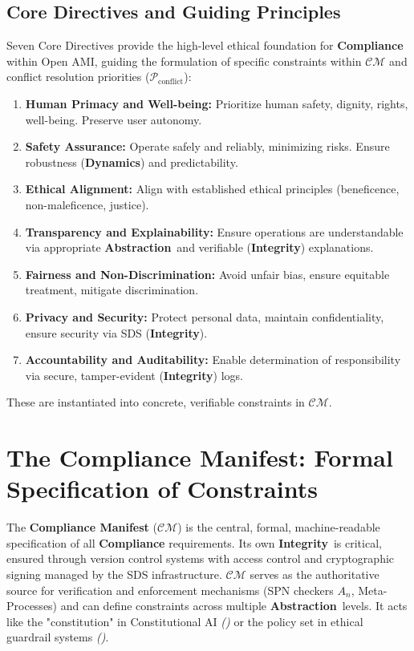 \documentclass[12pt,a4paper]{report}
\renewcommand{\citep}[1]{\textit{\scriptsize{(\cite{#1})}}}
\newcommand{\Integrity}{\textbf{Integrity}}
\newcommand{\Abstraction}{\textbf{Abstraction}}
\newcommand{\Dynamics}{\textbf{Dynamics}}
\begin{document}
	\subsection{Core Directives and Guiding Principles} %
	\label{sec:5-1-3} %
	
	Seven Core Directives provide the high-level ethical foundation for \textbf{Compliance} within Open AMI, guiding the formulation of specific constraints within $\mathcal{CM}$ and conflict resolution priorities ($\mathcal{P}_{\text{conflict}}$):
	\begin{enumerate}[noitemsep]
		\item \textbf{Human Primacy and Well-being:} Prioritize human safety, dignity, rights, well-being. Preserve user autonomy.
		\item \textbf{Safety Assurance:} Operate safely and reliably, minimizing risks. Ensure robustness (\Dynamics) and predictability.
		\item \textbf{Ethical Alignment:} Align with established ethical principles (beneficence, non-maleficence, justice).
		\item \textbf{Transparency and Explainability:} Ensure operations are understandable via appropriate \Abstraction\ and verifiable (\Integrity) explanations.
		\item \textbf{Fairness and Non-Discrimination:} Avoid unfair bias, ensure equitable treatment, mitigate discrimination.
		\item \textbf{Privacy and Security:} Protect personal data, maintain confidentiality, ensure security via SDS (\Integrity).
		\item \textbf{Accountability and Auditability:} Enable determination of responsibility via secure, tamper-evident (\Integrity) logs.
	\end{enumerate}
	These are instantiated into concrete, verifiable constraints in $\mathcal{CM}$.
	
	\section{The Compliance Manifest: Formal Specification of Constraints} %
	\label{sec:5-2} %
	
	The \textbf{Compliance Manifest} ($\mathcal{CM}$) is the central, formal, machine-readable specification of all \textbf{Compliance} requirements. Its own \Integrity\ is critical, ensured through version control systems with access control and cryptographic signing managed by the SDS infrastructure. $\mathcal{CM}$ serves as the authoritative source for verification and enforcement mechanisms (SPN checkers $A_n$, Meta-Processes) and can define constraints across multiple \Abstraction\ levels. It acts like the "constitution" in Constitutional AI \citep{Bai2022ConstitutionalAI} or the policy set in ethical guardrail systems \citep{Sekrst2024Guardrails}.
	
\end{document}
